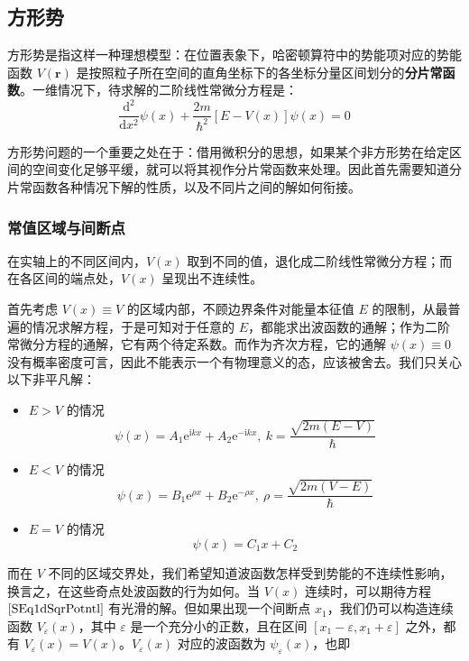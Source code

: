 \documentclass[cn,10pt,math=newtx,citestyle=gb7714-2015,bibstyle=gb7714-2015]{elegantbook}
\def\bm{\boldsymbol}
\def\d{\mathrm d}
\def\e{\mathrm e}
\def\i{\mathrm i}
\begin{document}
\subsection{方形势}

方形势是指这样一种理想模型：在位置表象下，哈密顿算符中的势能项对应的势能函数 $V(\bm r)$ 是按照粒子所在空间的直角坐标下的各坐标分量区间划分的\textbf{分片常函数}。一维情况下，待求解的二阶线性常微分方程是：
\begin{equation}\label{SEq1dSqrPotntl}
    \frac{\d^2}{\d x^2}\psi(x)+\frac{2m}{\hbar^2}[E-V(x)]\psi(x)=0
\end{equation}

方形势问题的一个重要之处在于：借用微积分的思想，如果某个非方形势在给定区间的空间变化足够平缓，就可以将其视作分片常函数来处理。因此首先需要知道分片常函数各种情况下解的性质，以及不同片之间的解如何衔接。

\subsubsection{常值区域与间断点}
在实轴上的不同区间内，$V(x)$ 取到不同的值，退化成二阶线性常微分方程；而在各区间的端点处，$V(x)$ 呈现出不连续性。

首先考虑 $V(x)\equiv V$ 的区域内部，不顾边界条件对能量本征值 $E$ 的限制，从最普遍的情况求解方程，于是可知对于任意的 $E$，都能求出波函数的通解；作为二阶常微分方程的通解，它有两个待定系数。而作为齐次方程，它的通解 $\psi(x)\equiv 0$ 没有概率密度可言，因此不能表示一个有物理意义的态，应该被舍去。我们只关心以下非平凡解： 

\begin{itemize}
    \item $E>V$ 的情况
    \begin{equation}\label{SEq1dSqrPotntlSlt1}
        \psi(x)=A_1\e^{\i kx}+A_2\e^{-\i kx},\ k=\frac{\sqrt{2m(E-V)}}{\hbar}
    \end{equation}
    \item $E<V$ 的情况
    \begin{equation}\label{SEq1dSqrPotntlSlt2}
        \psi(x)=B_1\e^{\rho x}+B_2\e^{-\rho x},\ \rho=\frac{\sqrt{2m(V-E)}}{\hbar}
    \end{equation}
    \item $E=V$ 的情况
    \begin{equation}\label{SEq1dSqrPotntlSlt3}
        \psi(x)=C_1x+C_2
    \end{equation}
\end{itemize}

而在 $V$ 不同的区域交界处，我们希望知道波函数怎样受到势能的不连续性影响，换言之，在这些奇点处波函数的行为如何。当 $V(x)$ 连续时，可以期待方程 $\ref{SEq1dSqrPotntl}$ 有光滑的解。但如果出现一个间断点 $x_1$，我们仍可以构造连续函数 $V_\varepsilon(x)$，其中 $\varepsilon$ 是一个充分小的正数，且在区间 $[x_1-\varepsilon,x_1+\varepsilon]$ 之外，都有 $V_\varepsilon(x)=V(x)$。$V_\varepsilon(x)$ 对应的波函数为 $\psi_\varepsilon(x)$，也即
\end{document}
